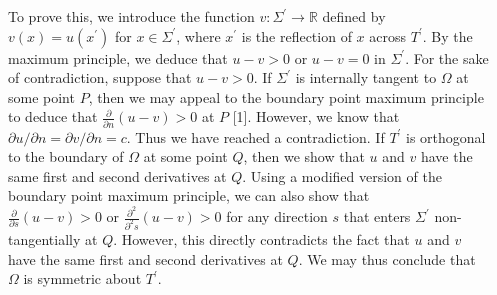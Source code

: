 \documentclass[20pt,,margin=1in,innermargin=-4.5in,blockverticalspace=-0.25in]{tikzposter}
\begin{document}
\begin{columns}
{\begin{center}
\begin{tikzpicture}[x=0.75pt,y=0.75pt,yscale=-1.65,xscale=1.65]
\end{tikzpicture}
\end{center}
    To prove this, we introduce the function $v: \Sigma^\prime \rightarrow \mathbb{R}$ defined by $v(x) = u(x^\prime)$ for $x \in \Sigma^\prime$, where $x^\prime$ is the reflection of $x$ across $T^\prime$. By the maximum principle, we deduce that $u - v > 0$ or $u-v = 0$ in $\Sigma^\prime$. For the sake of contradiction, suppose that $u-v > 0$.  If $\Sigma^\prime$ is internally tangent to $\Omega$ at some point $P$, then we may appeal to the boundary point maximum principle to deduce that $\frac{\partial}{\partial{n}}(u-v) > 0$ at $P$ [1]. However, we know that $\partial{u}/\partial{n} = \partial{v}/\partial{n} = c$. Thus we have reached a contradiction. If $T^\prime$ is orthogonal to the boundary of $\Omega$ at some point $Q$, then we show that $u$ and $v$ have the same first and second derivatives at $Q$. Using a modified version of the boundary point maximum principle, we can also show that $\frac{\partial}{\partial{s}} (u-v) > 0 \text{ or } \frac{\partial^2}{\partial^2{s}}(u-v) > 0$ for any direction $s$ that enters $\Sigma^\prime$ non-tangentially at $Q$. However, this directly contradicts the fact that $u$ and $v$ have the same first and second derivatives at $Q$. We may thus conclude that $\Omega$ is symmetric about $T^\prime$.
}



\end{columns}
\end{document}
